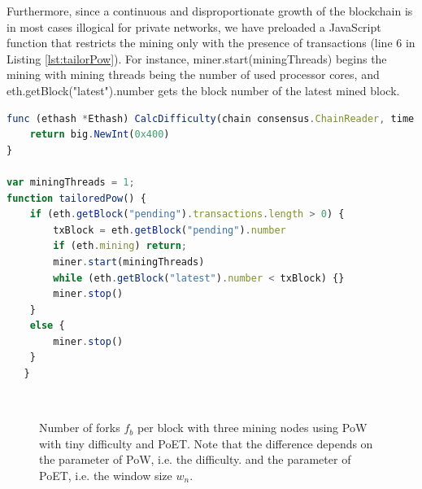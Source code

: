 Furthermore, since a continuous and disproportionate growth of the blockchain is in most cases illogical for private networks, we have preloaded a JavaScript function that restricts the mining only with the presence of transactions (line 6 in Listing \ref{lst:tailorPow}). For instance, miner.start(miningThreads) begins the mining with mining threads being the number of used processor cores, and eth.getBlock("latest").number gets the block number of the latest mined block.
\newline

\begin{lstlisting}[language=JavaScript,caption={Defined functions that specify the block difficulty and the tailored PoW.}, label={lst:tailorPow}]
func (ethash *Ethash) CalcDifficulty(chain consensus.ChainReader, time uint64, parent *types.Header) *big.Int {
    return big.NewInt(0x400)
}

var miningThreads = 1;
function tailoredPow() {
    if (eth.getBlock("pending").transactions.length > 0) {
        txBlock = eth.getBlock("pending").number
        if (eth.mining) return;
        miner.start(miningThreads)
        while (eth.getBlock("latest").number < txBlock) {}
        miner.stop()
    }
    else {
        miner.stop()
    }
   }
\end{lstlisting}

\begin{figure}[bth]
	\myfloatalign
	 \quad
	 \\
	\caption{Number of forks $f_b$ per block with three mining nodes using PoW with tiny difficulty and PoET. Note that the difference depends on the parameter of PoW, i.e. the difficulty. and the parameter of PoET, i.e. the window size $w_n$.}
	\label{fig:forks}
\end{figure}

